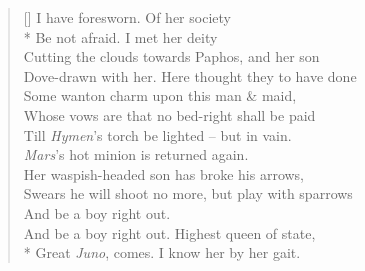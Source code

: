 \documentclass[MAIN]{subfiles}
\begin{document}
\begin{verse}[\versewidth]
{\color{white} I have foresworn.} Of her society\\*
Be not afraid. I met her deity\\
Cutting the clouds towards {\sc Paphos}, and her son\\
Dove-drawn with her. Here thought they to have done\\
Some wanton charm upon this man \& maid,\\
Whose vows are that no bed-right shall be paid\\
Till \emph{Hymen}'s torch be lighted -- but in vain.\\
\emph{Mars}'s hot minion is returned again.\\
Her waspish-headed son has broke his arrows,\\
Swears he will shoot no more, but play with sparrows\\
And be a boy right out.\\
{\color{white} And be a boy right out.} Highest queen of state,\\*
Great \emph{Juno}, comes. I know her by her gait.
\end{verse}
\end{document}
